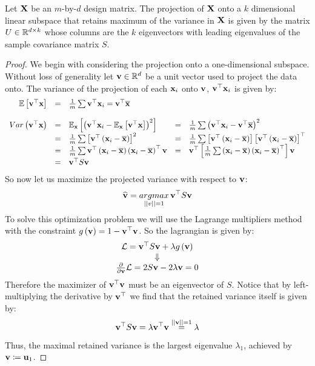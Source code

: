 \begin{theorem}\label{pca_max_var}
Let $\mathbf{X}$ be an $m$-by-$d$ design matrix. The projection of $\mathbf{X}$ onto a $k$ dimensional linear subspace that retains maximum of the variance in $\mathbf{X}$ is given by the matrix $U\in\mathbb{R}^{d\times k}$ whose columns are the $k$ eigenvectors with leading eigenvalues of the sample covariance matrix $S$.
\end{theorem}
\begin{proof}
We begin with considering the projection onto a one-dimensional subspace. Without loss of generality let $\mathbf{v}\in\mathbb{R}^d$ be a unit vector used to project the data onto. The variance of the projection of each $\mathbf{x}_i$ onto $\mathbf{v}$, $\mathbf{v}^\top\mathbf{x}_i$ is given by:
$$
\begin{array}{rclcl}
	\mathbb{E}\left[\mathbf{v}^\top \mathbf{x}\right] & = & \frac{1}{m}\sum \mathbf{v}^\top \mathbf{x}_i =\mathbf{v}^\top \overline{\mathbf{x}} \\
	\\
	Var\left(\mathbf{v}^\top \mathbf{x}\right) & = & \mathbb{E}_{\mathbf{x}}\left[\left(\mathbf{v}^\top \mathbf{x}_i - \mathbb{E}_{\mathbf{x}}\left[\mathbf{v}^\top \mathbf{x}\right]\right)^2\right]
	& = & \frac{1}{m}\sum\left(\mathbf{v}^\top \mathbf{x}_i - \mathbf{v}^\top \overline{\mathbf{x}}\right)^2 \\
	& = & \frac{1}{m}\sum\left[\mathbf{v}^\top\left(\mathbf{x}_i - \overline{\mathbf{x}}\right)\right]^2
	& = & \frac{1}{m}\sum \left[\mathbf{v}^\top\left(\mathbf{x}_i - \overline{\mathbf{x}}\right)\right]\left[\mathbf{v}^\top\left(\mathbf{x}_i - \overline{\mathbf{x}}\right)\right]^\top \\
	& = & \frac{1}{m}\sum \mathbf{v}^\top\left(\mathbf{x}_i - \overline{\mathbf{x}}\right)\left(\mathbf{x}_i - \overline{\mathbf{x}}\right)^\top \mathbf{v}
	& = & \mathbf{v}^\top\left[\frac{1}{m}\sum\left(\mathbf{x}_i - \overline{\mathbf{x}}\right)\left(\mathbf{x}_i - \overline{\mathbf{x}}\right)^\top\right]\mathbf{v} \\
	& = & \mathbf{v}^\top S \mathbf{v}
\end{array}
$$
So now let us maximize the projected variance with respect to $\mathbf{v}$:
$$ \widehat{\mathbf{v}} = \underset{\left|\left| v\right|\right|=1}{argmax}\, \mathbf{v}^\top S\mathbf{v} $$ To solve this optimization problem we will use the Lagrange multipliers method with the constraint $g\left(\mathbf{v}\right) = 1-\mathbf{v}^\top \mathbf{v}$. So the lagrangian is given by:
$$\begin{array}{c}
\mathcal{L} = \mathbf{v}^\top S \mathbf{v} + \lambda g\left(\mathbf{v}\right)\\
\Downarrow\\
\frac{\partial}{\partial \mathbf{v}}\mathcal{L} = 2S\mathbf{v} - 2\lambda \mathbf{v} = 0
\end{array}$$
Therefore the maximizer of $\mathbf{v}^\top\mathbf{v}$ must be an eigenvector of $S$. Notice that by left-multiplying the derivative by $\mathbf{v}^\top$ we find that the retained variance itself is given by: $$ \mathbf{v}^\top S\mathbf{v} = \lambda\mathbf{v}^\top\mathbf{v} \overset{\left|\left| \mathbf{v}\right|\right|=1}{=} \lambda$$
Thus, the maximal retained variance is the largest eigenvalue $\lambda_1$, achieved by $\mathbf{v}\coloneqq\mathbf{u}_1$.


\end{proof}
